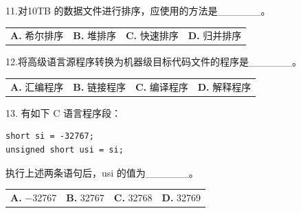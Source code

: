 \documentclass[UTF8,11pt]{ctexart}
\begin{document}
11.对10TB 的数据文件进行排序，应使用的方法是\_\_\_\_\_\_。


\begin{center}\begin{tabular}{>{\raggedright\arraybackslash}p{\dimexpr(\linewidth-8\tabcolsep)/4\relax}>{\raggedright\arraybackslash}p{\dimexpr(\linewidth-8\tabcolsep)/4\relax}>{\raggedright\arraybackslash}p{\dimexpr(\linewidth-8\tabcolsep)/4\relax}>{\raggedright\arraybackslash}p{\dimexpr(\linewidth-8\tabcolsep)/4\relax}}
\textbf{A.} 希尔排序 & \textbf{B.} 堆排序 & \textbf{C.} 快速排序 & \textbf{D.} 归并排序\\[.35em]\end{tabular}\end{center}

12.将高级语言源程序转换为机器级目标代码文件的程序是\_\_\_\_\_\_。


\begin{center}\begin{tabular}{>{\raggedright\arraybackslash}p{\dimexpr(\linewidth-8\tabcolsep)/4\relax}>{\raggedright\arraybackslash}p{\dimexpr(\linewidth-8\tabcolsep)/4\relax}>{\raggedright\arraybackslash}p{\dimexpr(\linewidth-8\tabcolsep)/4\relax}>{\raggedright\arraybackslash}p{\dimexpr(\linewidth-8\tabcolsep)/4\relax}}
\textbf{A.} 汇编程序 & \textbf{B.} 链接程序 & \textbf{C.} 编译程序 & \textbf{D.} 解释程序\\[.35em]\end{tabular}\end{center}

13. 有如下 C 语言程序段：


\begin{Verbatim}[breaklines,breakanywhere,fontsize=\small]
short si = -32767;
unsigned short usi = si;
\end{Verbatim}

执行上述两条语句后，usi 的值为\_\_\_\_\_\_。


\begin{center}\begin{tabular}{>{\raggedright\arraybackslash}p{\dimexpr(\linewidth-8\tabcolsep)/4\relax}>{\raggedright\arraybackslash}p{\dimexpr(\linewidth-8\tabcolsep)/4\relax}>{\raggedright\arraybackslash}p{\dimexpr(\linewidth-8\tabcolsep)/4\relax}>{\raggedright\arraybackslash}p{\dimexpr(\linewidth-8\tabcolsep)/4\relax}}
\textbf{A.} −32767 & \textbf{B.} 32767 & \textbf{C.} 32768 & \textbf{D.} 32769\\[.35em]\end{tabular}\end{center}
\end{document}
